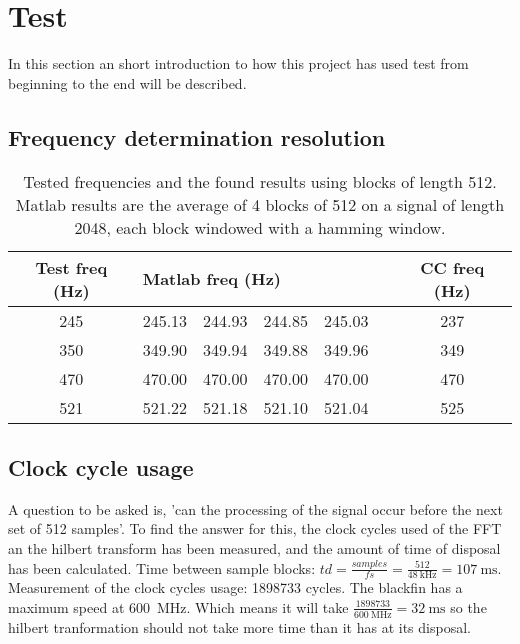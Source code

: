 
\section{Test}
\label{sec:test}
In this section an short introduction to how this project has used test from beginning to the end will be described.
\subsection{Frequency determination resolution}
\begin{table}
	\centering
	\begin{tabular}{c | c c c c c | c}
		\toprule
		Test freq (Hz) & \multicolumn{4}{l}{Matlab freq (Hz)} & & CC freq (Hz) \\
		\midrule
		\num{245} & \num{245.13} & \num{244.93} & \num{244.85} & \num{245.03} && \num{237}\\
		\num{350} & \num{349.90} & \num{349.94} & \num{349.88} & \num{349.96} && \num{349}\\
		\num{470} & \num{470.00} & \num{470.00} & \num{470.00} & \num{470.00} && \num{470} \\
		\num{521} & \num{521.22} & \num{521.18} & \num{521.10} & \num{521.04} && \num{525} \\
		\bottomrule
	\end{tabular}
	\caption{Tested frequencies and the found results using blocks of length \num{512}. Matlab results are the average of 4 blocks of \num{512} on a signal of length \num{2048}, each block windowed with a hamming window.}
	\label{tab:test}
\end{table}

\subsection{Clock cycle usage}
A question to be asked is, 'can the processing of the signal occur before the next set of 512 samples'. To find the answer for this, the clock cycles used of the FFT an the hilbert transform has been measured, and the amount of time of disposal has been calculated.\newline
Time between sample blocks: $td = \frac{samples}{fs} = \frac{512}{\SI{48}{\kilo\hertz}} = \SI{107}{\milli\second}$. \newline
Measurement of the clock cycles usage: \num{1898733} cycles. \newline
The blackfin has a maximum speed at \SI{600}{\mega\hertz}. Which means it will take $\frac{\num{1898733}}{\SI{600}{\mega\hertz}} = {\SI{32}{\milli\second}}$ so the hilbert tranformation should not take more time than it has at its disposal.


\FloatBarrier